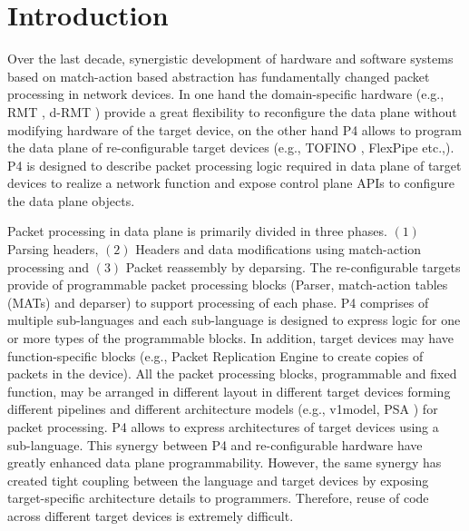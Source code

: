 \section{Introduction}
Over the last decade, synergistic development of hardware and software systems based on match-action based abstraction has fundamentally changed packet processing in network devices.
In one hand the domain-specific hardware (e.g., RMT \cite{Bosshart:2013:FMF:2486001.2486011}, d-RMT \cite{Chole:2017:DDP:3098822.3098823}) provide a great flexibility to reconfigure the data plane without modifying hardware of the target device, on the other hand P4 \cite{Bosshart:2014:PPP:2656877.2656890, p4lang} allows to program the data plane of re-configu\-rable target devices (e.g., TOFINO \cite{tofino}, FlexPipe etc.,).
P4 is designed to describe packet processing logic required in data plane of target devices to realize a network function and expose control plane APIs to configure the data plane objects.

Packet processing in data plane is primarily divided in three phases. $(1)$ Parsing headers, $(2)$ Headers and data modifications using match-action processing and $(3)$ Packet reassembly by deparsing.
The re-configurable targets provide of programmable packet processing blocks (Parser, match-action tables (MATs) and deparser) to support processing of each phase. 
P4 comprises of multiple sub-languages and each sub-language is designed to express logic for one or more types of the programmable blocks. 
In addition, target devices may have function-specific blocks (e.g., Packet Replication Engine to create copies of packets in the device).
All the packet processing blocks, programmable and fixed function, may be arranged in different layout in different target devices forming different pipelines and different architecture models (e.g., v1model\cite{v1model.p4}, PSA \cite{psa}) for packet processing.
P4 allows to express architectures of target devices using a sub-language.
This synergy between P4 and re-configurable hardware have greatly enhanced data plane programmability. 
However, the same synergy has created tight coupling between the language and target devices by exposing target-specific architecture details to programmers.
Therefore, reuse of code across different target devices is extremely difficult.


